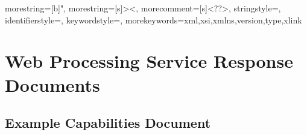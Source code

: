 
{
	morestring=[b]",
	morestring=[s]{>}{<},
	morecomment=[s]{<?}{?>},
	stringstyle=\color{black},
	identifierstyle=\color{darkblue},
	keywordstyle=\color{cyan},
	morekeywords={xml,xsi,xmlns,version,type,xlink}%
}


\chapter{Web Processing Service Response Documents}
\label{app:WPS}

\section{Example Capabilities Document}

